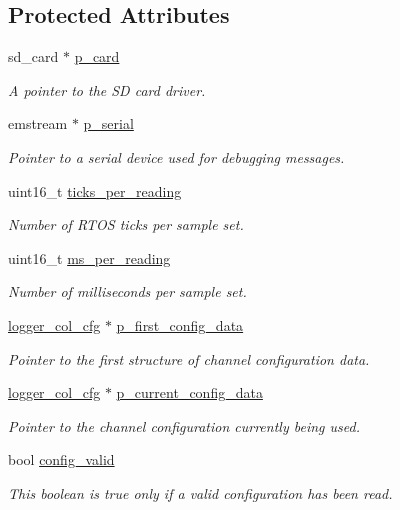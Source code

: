 \subsection*{Protected Attributes}
\begin{DoxyCompactItemize}
\item 
sd\-\_\-card $\ast$ \hyperlink{classlogger__config_ab9beda58d9d147e75ce85b3b8024cc20}{p\-\_\-card}
\begin{DoxyCompactList}\small\item\em A pointer to the S\-D card driver. \end{DoxyCompactList}\item 
emstream $\ast$ \hyperlink{classlogger__config_ab21ca3930913e75c8e4c6cc2163f4bd7}{p\-\_\-serial}
\begin{DoxyCompactList}\small\item\em Pointer to a serial device used for debugging messages. \end{DoxyCompactList}\item 
uint16\-\_\-t \hyperlink{classlogger__config_a24d69cc1f5e9cea4f0d0b3cda10a0fd8}{ticks\-\_\-per\-\_\-reading}
\begin{DoxyCompactList}\small\item\em Number of R\-T\-O\-S ticks per sample set. \end{DoxyCompactList}\item 
uint16\-\_\-t \hyperlink{classlogger__config_aced003cf2337160be6d8288f10f116d2}{ms\-\_\-per\-\_\-reading}
\begin{DoxyCompactList}\small\item\em Number of milliseconds per sample set. \end{DoxyCompactList}\item 
\hyperlink{classlogger__col__cfg}{logger\-\_\-col\-\_\-cfg} $\ast$ \hyperlink{classlogger__config_aa522d8c1a166234b677909cea6580cf5}{p\-\_\-first\-\_\-config\-\_\-data}
\begin{DoxyCompactList}\small\item\em Pointer to the first structure of channel configuration data. \end{DoxyCompactList}\item 
\hyperlink{classlogger__col__cfg}{logger\-\_\-col\-\_\-cfg} $\ast$ \hyperlink{classlogger__config_aaf8a326ecea11b1f24a574f96fb5e52f}{p\-\_\-current\-\_\-config\-\_\-data}
\begin{DoxyCompactList}\small\item\em Pointer to the channel configuration currently being used. \end{DoxyCompactList}\item 
\hypertarget{classlogger__config_a1b17eb2e849a07d44c2846b2599d57a5}{bool \hyperlink{classlogger__config_a1b17eb2e849a07d44c2846b2599d57a5}{config\-\_\-valid}}\label{classlogger__config_a1b17eb2e849a07d44c2846b2599d57a5}

\begin{DoxyCompactList}\small\item\em This boolean is true only if a valid configuration has been read. \end{DoxyCompactList}\end{DoxyCompactItemize}
